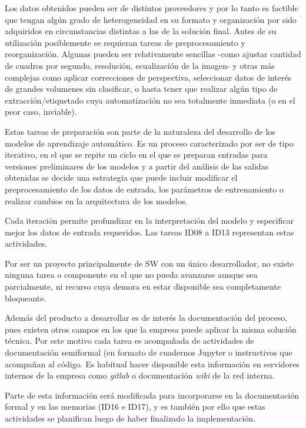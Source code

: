\documentclass[11pt]{charter}
\begin{document}
Los datos obtenidos pueden ser de distintos proveedores y por lo tanto es factible que tengan algún grado de heterogeneidad en su formato y organización por sido adquiridos en circunstancias distintas a las de la solución final. Antes de su utilización posiblemente se requieran tareas de preprocesamiento y reorganización. Algunas pueden ser relativamente sencillas -como ajustar cantidad de cuadros por segundo, resolución, ecualización de la imagen- y otras más complejas como aplicar correcciones de perspectiva, seleccionar datos de interés de grandes volumenes sin clasificar, o hasta tener que realizar algún tipo de extracción/etiquetado cuya automatización no sea totalmente inmediata (o en el peor caso, inviable).

Estas tareas de preparación son parte de la naturaleza del desarrollo de los modelos de aprendizaje automático. Es un proceso caracterizado por ser de tipo iterativo, en el que se repite un ciclo en el que se preparan entradas para versiones preliminares de los modelos y a partir del análisis de las salidas obtenidas se decide una estrategia que puede incluir modificar el preprocesamiento de los datos de entrada, los parámetros de entrenamiento o realizar cambios en la arquitectura de los modelos.

Cada iteración permite profundizar en la interpretación del modelo y especificar mejor los datos de entrada requeridos. Las tareas ID08 a ID13 representan estas actividades.

Por ser un proyecto principalmente de SW con un único desarrollador, no existe ninguna tarea o componente en el que no pueda avanzarse aunque sea parcialmente, ni recurso cuya demora en estar disponible sea completamente bloqueante. 

Además del producto a desarrollar es de interés la documentación del proceso, pues existen otros campos en los que la empresa puede aplicar la misma solución técnica. Por este motivo cada tarea es acompañada de actividades de documentación semiformal (en formato de cuadernos Jupyter o instructivos que acompañan al código. Es habitual hacer disponible esta información en servidores internos de la empresa como {\em gitlab} o documentación {\em wiki} de la red interna. 

Parte de esta información será modificada para incorporarse en la documentación formal y en las memorias (ID16 e ID17), y es también por ello que estas actividades se planifican luego de haber finalizado la implementación.
\end{document}
